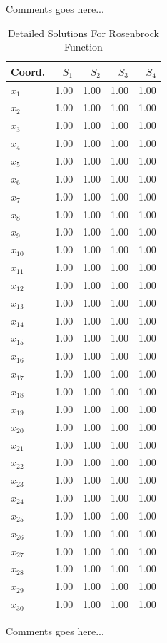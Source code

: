 \documentclass{ieeeaccess}
\begin{document}
Comments goes here...
\begin{table}
\centering
\caption{Detailed Solutions For Rosenbrock Function}
\label{detailedsolutions:rosenbrock30d}
\begin{tabular}{lrrrr}
\toprule
  Coord. &  $S_{1}$ &  $S_{2}$ &  $S_{3}$ &  $S_{4}$ \\
\midrule
 $x_{1}$ &     1.00 &     1.00 &     1.00 &     1.00 \\
 $x_{2}$ &     1.00 &     1.00 &     1.00 &     1.00 \\
 $x_{3}$ &     1.00 &     1.00 &     1.00 &     1.00 \\
 $x_{4}$ &     1.00 &     1.00 &     1.00 &     1.00 \\
 $x_{5}$ &     1.00 &     1.00 &     1.00 &     1.00 \\
 $x_{6}$ &     1.00 &     1.00 &     1.00 &     1.00 \\
 $x_{7}$ &     1.00 &     1.00 &     1.00 &     1.00 \\
 $x_{8}$ &     1.00 &     1.00 &     1.00 &     1.00 \\
 $x_{9}$ &     1.00 &     1.00 &     1.00 &     1.00 \\
$x_{10}$ &     1.00 &     1.00 &     1.00 &     1.00 \\
$x_{11}$ &     1.00 &     1.00 &     1.00 &     1.00 \\
$x_{12}$ &     1.00 &     1.00 &     1.00 &     1.00 \\
$x_{13}$ &     1.00 &     1.00 &     1.00 &     1.00 \\
$x_{14}$ &     1.00 &     1.00 &     1.00 &     1.00 \\
$x_{15}$ &     1.00 &     1.00 &     1.00 &     1.00 \\
$x_{16}$ &     1.00 &     1.00 &     1.00 &     1.00 \\
$x_{17}$ &     1.00 &     1.00 &     1.00 &     1.00 \\
$x_{18}$ &     1.00 &     1.00 &     1.00 &     1.00 \\
$x_{19}$ &     1.00 &     1.00 &     1.00 &     1.00 \\
$x_{20}$ &     1.00 &     1.00 &     1.00 &     1.00 \\
$x_{21}$ &     1.00 &     1.00 &     1.00 &     1.00 \\
$x_{22}$ &     1.00 &     1.00 &     1.00 &     1.00 \\
$x_{23}$ &     1.00 &     1.00 &     1.00 &     1.00 \\
$x_{24}$ &     1.00 &     1.00 &     1.00 &     1.00 \\
$x_{25}$ &     1.00 &     1.00 &     1.00 &     1.00 \\
$x_{26}$ &     1.00 &     1.00 &     1.00 &     1.00 \\
$x_{27}$ &     1.00 &     1.00 &     1.00 &     1.00 \\
$x_{28}$ &     1.00 &     1.00 &     1.00 &     1.00 \\
$x_{29}$ &     1.00 &     1.00 &     1.00 &     1.00 \\
$x_{30}$ &     1.00 &     1.00 &     1.00 &     1.00 \\
\bottomrule
\end{tabular}
\end{table}


Comments goes here...

\EOD
\end{document}
